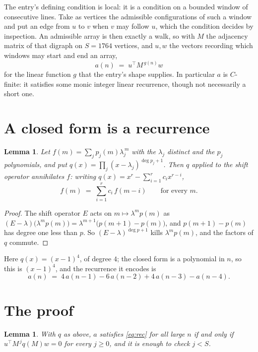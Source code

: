\documentclass[11pt,a4paper]{article}
\theoremstyle{plain}
\newtheorem{lemma}[theorem]{Lemma}
\theoremstyle{definition}
\begin{document}
The entry's defining condition is local: it is a condition on a bounded window of consecutive lines. Take as vertices the
admissible configurations of such a window and put an edge from $u$ to $v$ when $v$ may
follow $u$, which the condition decides by inspection. An admissible array is then exactly a
walk, so with $M$ the adjacency matrix of that digraph on $S=1764$ vertices, and $u,w$ the
vectors recording which windows may start and end an array,
\[
a(n)\;=\;u^{\!\top}M^{\,g(n)}w
\]
for the linear function $g$ that the entry's shape supplies. In particular $a$ is
$C$-finite: it satisfies some monic integer linear recurrence, though not necessarily a short
one.

\section{A closed form is a recurrence}

\begin{lemma}\label{lem:ann}
Let $f(m)=\sum_{j}p_j(m)\lambda_j^{\,m}$ with the $\lambda_j$ distinct and the $p_j$
polynomials, and put $q(x)=\prod_j(x-\lambda_j)^{\deg p_j+1}$. Then $q$ applied to the shift
operator annihilates $f$: writing $q(x)=x^{r}-\sum_{i=1}^{r}c_ix^{r-i}$,
\[
f(m)\;=\;\sum_{i=1}^{r}c_i\,f(m-i)\qquad\text{for every }m.
\]
\end{lemma}

\begin{proof}
The shift operator $E$ acts on $m\mapsto\lambda^{m}p(m)$ as
$(E-\lambda)\bigl(\lambda^{m}p(m)\bigr)=\lambda^{m+1}\bigl(p(m+1)-p(m)\bigr)$, and
$p(m+1)-p(m)$ has degree one less than $p$. So $(E-\lambda)^{\deg p+1}$ kills
$\lambda^{m}p(m)$, and the factors of $q$ commute.
\end{proof}

Here $q(x)=(x-1)^{4}$, of degree $4$; the closed form is a polynomial in $n$, so this is $(x-1)^{4}$, and the recurrence it encodes is
\begin{equation}\label{eq:rec}
a(n)\;=\;4\,a(n-1) - 6\,a(n-2) + 4\,a(n-3) - a(n-4).
\end{equation}

\section{The proof}

\begin{lemma}\label{lem:crit}
With $q$ as above, $a$ satisfies \eqref{eq:rec} for all large $n$ if and only if
$u^{\!\top}M^{\,j}q(M)w=0$ for every $j\ge0$, and it is enough to check $j<S$.
\end{lemma}
\end{document}
